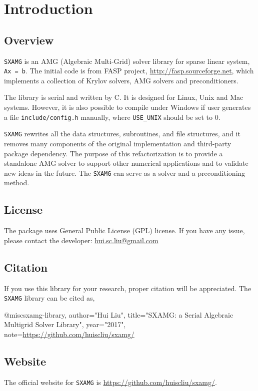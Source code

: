 
\chapter{Introduction}

\section{Overview}

\verb|SXAMG| is an AMG (Algebraic Multi-Grid) solver 
library for sparse linear system, \verb|Ax = b|. 
The initial code is from FASP project, \url{http://fasp.sourceforge.net}, which implements a collection of Krylov solvers, AMG solvers and preconditioners.

The library is serial and written by C.
It is designed for Linux, Unix and Mac systems. However, 
it is also possible to compile under Windows if user generates a file \verb|include/config.h| manually,
where \verb|USE_UNIX| should be set to 0. 

\verb|SXAMG| rewrites all the data structures, subroutines, and file structures, and it removes many components of the original implementation and third-party package dependency.
The purpose of this refactorization is to provide a standalone AMG solver to support 
other numerical applications and to validate new ideas in the future. 
The \verb|SXAMG| can serve as a solver and a preconditioning method.

\section{License}

The package uses General Public License (GPL) license. 
If you have any issue, please contact the developer: \href{mailto: hui.sc.liu@gmail.com}{hui.sc.liu@gmail.com}

\section{Citation}

If you use this library for your research, proper citation will be appreciated.
The \verb|SXAMG| library can be cited as,
\begin{evb}
@misc{sxamg-library,
    author="Hui Liu",
    title="SXAMG: a Serial Algebraic Multigrid Solver Library",
    year="2017",
    note={\url{https://github.com/huiscliu/sxamg/}}
}
\end{evb}


\section{Website}
The official website for \verb|SXAMG| is \url{https://github.com/huiscliu/sxamg/}.

